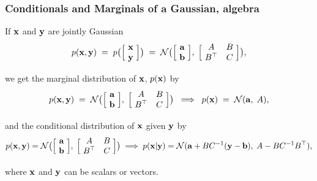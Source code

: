 \begin{frame}
\frametitle{Conditionals and Marginals of a Gaussian, algebra}

If ${\bf x}$ and ${\bf y}$ are jointly Gaussian
\[
p(\mathbf x,\mathbf y)\;=\;p\big(\Big[\!\begin{array}{c}\mathbf x\\ \mathbf y\end{array}
\!\Big]\big)\;=\;{\cal N}\big(\Big[\!\begin{array}{c}{\bf a} \\ {\bf b}\end{array}\!\Big],
\;\Big[\!\begin{array}{cc}A & B \\ B^\top & C\end{array}\!\Big]\big),
\]

we get the marginal distribution of ${\bf x}$, $p(\mathbf x)$ by
\[
p(\mathbf x,\mathbf y)\;=\;{\cal N}\big(\Big[\!\begin{array}{c}{\bf a} \\ {\bf b}
\end{array}\!\Big],
\;\Big[\!\begin{array}{cc}A & B \\ B^\top & C\end{array}\!\Big]\big)
\;\;\Longrightarrow\;\;p(\mathbf x)\;=\;{\cal N}({\bf a},\;A),
\]

and the conditional distribution of ${\bf x}$ given ${\bf y}$ by
\[
p(\mathbf x,\mathbf y)={\cal N}\big(\Big[\!\begin{array}{c}{\bf a} \\ {\bf b}
\end{array}\!\Big],
\;\Big[\!\begin{array}{cc}A & B \\ B^\top & C\end{array}\!\Big]\big)
\;\Longrightarrow\;p(\mathbf x|\mathbf y)={\cal N}({\bf a}+BC^{-1}(\mathbf y-\mathbf b),\;
A-BC^{-1}B^\top),
\]

where ${\bf x}$ and ${\bf y}$ can be scalars or vectors.
\end{frame}


